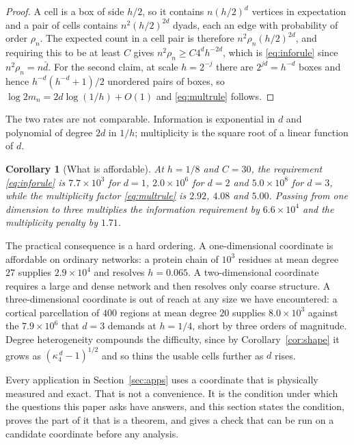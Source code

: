 \documentclass[11pt]{article}
\newtheorem{corollary}[theorem]{Corollary}
\theoremstyle{definition}
\newcommand{\1}{\mathbf 1}\newcommand{\op}{\operatorname}
\begin{document}
\begin{proof}
A cell is a box of side $h/2$, so it contains $n(h/2)^{d}$ vertices in
expectation and a pair of cells contains $n^{2}(h/2)^{2d}$ dyads, each an edge
with probability of order $\rho_n$.  The expected count in a cell pair is
therefore $n^{2}\rho_n(h/2)^{2d}$, and requiring this to be at least $C$ gives
$n^{2}\rho_n\ge C4^{d}h^{-2d}$, which is \eqref{eq:inforule} since
$n^{2}\rho_n=n\bar d$.  For the second claim, at scale $h=2^{-j}$ there are
$2^{jd}=h^{-d}$ boxes and hence $h^{-d}(h^{-d}+1)/2$ unordered pairs of boxes,
so $\log 2m_n=2d\log(1/h)+O(1)$ and \eqref{eq:multrule} follows.
\end{proof}

The two rates are not comparable.  Information is exponential in $d$ and
polynomial of degree $2d$ in $1/h$; multiplicity is the square root of a linear
function of $d$.

\begin{corollary}[What is affordable]                         \label{cor:afford}
At $h=1/8$ and $C=30$, the requirement \eqref{eq:inforule} is
$7.7\times10^{3}$ for $d=1$, $2.0\times10^{6}$ for $d=2$ and
$5.0\times10^{8}$ for $d=3$, while the multiplicity factor
\eqref{eq:multrule} is $2.92$, $4.08$ and $5.00$.  Passing from one dimension
to three multiplies the information requirement by $6.6\times10^{4}$ and the
multiplicity penalty by $1.71$.
\end{corollary}

The practical consequence is a hard ordering.  A one-dimensional coordinate is
affordable on ordinary networks: a protein chain of $10^{3}$ residues at mean
degree $27$ supplies $2.9\times10^{4}$ and resolves $h=0.065$.  A
two-dimensional coordinate requires a large and dense network and then
resolves only coarse structure.  A three-dimensional coordinate is out of reach
at any size we have encountered: a cortical parcellation of $400$ regions at
mean degree $20$ supplies $8.0\times10^{3}$ against the $7.9\times10^{6}$ that
$d=3$ demands at $h=1/4$, short by three orders of magnitude.  Degree
heterogeneity compounds the difficulty, since by Corollary~\ref{cor:shape} it
grows as $(\kappa_4^{\,d}-1)^{1/2}$ and so thins the usable cells further as
$d$ rises.

Every application in Section~\ref{sec:apps} uses a coordinate that is
physically measured and exact.  That is not a convenience.  It is the
condition under which the questions this paper asks have answers, and this
section states the condition, proves the part of it that is a theorem, and
gives a check that can be run on a candidate coordinate before any analysis.
\end{document}

